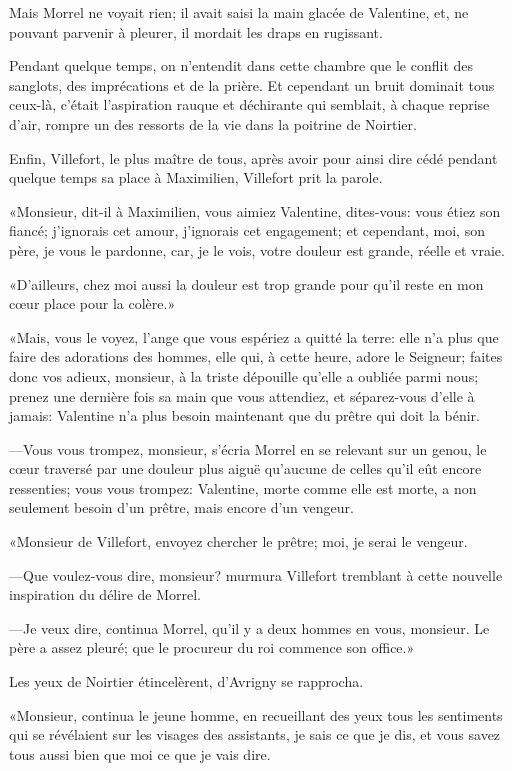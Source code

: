 Mais Morrel ne voyait rien; il avait saisi la main glacée de Valentine, et, ne pouvant parvenir à pleurer, il mordait les draps en rugissant. 

Pendant quelque temps, on n'entendit dans cette chambre que le conflit des sanglots, des imprécations et de la prière. Et cependant un bruit dominait tous ceux-là, c'était l'aspiration rauque et déchirante qui semblait, à chaque reprise d'air, rompre un des ressorts de la vie dans la poitrine de Noirtier. 

Enfin, Villefort, le plus maître de tous, après avoir pour ainsi dire cédé pendant quelque temps sa place à Maximilien, Villefort prit la parole. 

«Monsieur, dit-il à Maximilien, vous aimiez Valentine, dites-vous: vous étiez son fiancé; j'ignorais cet amour, j'ignorais cet engagement; et cependant, moi, son père, je vous le pardonne, car, je le vois, votre douleur est grande, réelle et vraie. 

«D'ailleurs, chez moi aussi la douleur est trop grande pour qu'il reste en mon cœur place pour la colère.» 

«Mais, vous le voyez, l'ange que vous espériez a quitté la terre: elle n'a plus que faire des adorations des hommes, elle qui, à cette heure, adore le Seigneur; faites donc vos adieux, monsieur, à la triste dépouille qu'elle a oubliée parmi nous; prenez une dernière fois sa main que vous attendiez, et séparez-vous d'elle à jamais: Valentine n'a plus besoin maintenant que du prêtre qui doit la bénir. 

—Vous vous trompez, monsieur, s'écria Morrel en se relevant sur un genou, le cœur traversé par une douleur plus aiguë qu'aucune de celles qu'il eût encore ressenties; vous vous trompez: Valentine, morte comme elle est morte, a non seulement besoin d'un prêtre, mais encore d'un vengeur. 

«Monsieur de Villefort, envoyez chercher le prêtre; moi, je serai le vengeur. 

—Que voulez-vous dire, monsieur? murmura Villefort tremblant à cette nouvelle inspiration du délire de Morrel. 

—Je veux dire, continua Morrel, qu'il y a deux hommes en vous, monsieur. Le père a assez pleuré; que le procureur du roi commence son office.» 

Les yeux de Noirtier étincelèrent, d'Avrigny se rapprocha. 

«Monsieur, continua le jeune homme, en recueillant des yeux tous les sentiments qui se révélaient sur les visages des assistants, je sais ce que je dis, et vous savez tous aussi bien que moi ce que je vais dire. 

